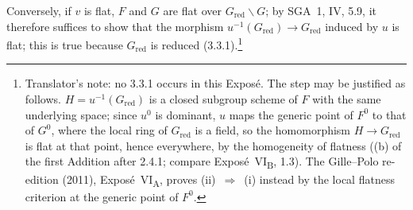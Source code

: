 Conversely, if \(v\) is flat, \(F\) and \(G\) are flat over
\(G_{\mathrm{red}}\backslash G\); by SGA~1, IV, 5.9, it therefore suffices to show that
the morphism \(u^{-1}(G_{\mathrm{red}})\to G_{\mathrm{red}}\) induced by \(u\) is flat;
this is true because \(G_{\mathrm{red}}\) is reduced (3.3.1).\footnote{Translator's note: no 3.3.1 occurs in this Exposé. The step may be
justified as follows. \(H=u^{-1}(G_{\mathrm{red}})\) is a closed subgroup scheme of \(F\) with the same
underlying space; since \(u^0\) is dominant, \(u\) maps the generic point of \(F^0\) to that of \(G^0\),
where the local ring of \(G_{\mathrm{red}}\) is a field, so the homomorphism \(H\to G_{\mathrm{red}}\) is
flat at that point, hence everywhere, by the homogeneity of flatness ((b) of the first Addition after
2.4.1; compare Exposé~VI\textsubscript{B}, 1.3). The Gille--Polo re-edition (2011),
Exposé~VI\textsubscript{A}, proves (ii)~\(\Rightarrow\)~(i) instead by the local flatness criterion at
the generic point of \(F^0\).}
